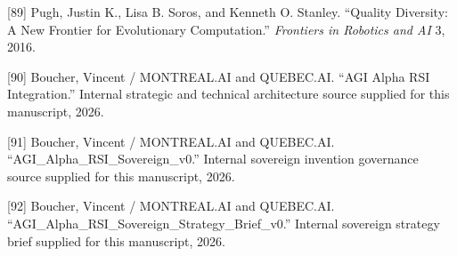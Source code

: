 \documentclass[
  11pt,
]{article}
\begin{document}
{[}89{]} Pugh, Justin K., Lisa B. Soros, and Kenneth O. Stanley.
``Quality Diversity: A New Frontier for Evolutionary Computation.''
\emph{Frontiers in Robotics and AI} 3, 2016.

{[}90{]} Boucher, Vincent / MONTREAL.AI and QUEBEC.AI. ``AGI Alpha RSI
Integration.'' Internal strategic and technical architecture source
supplied for this manuscript, 2026.

{[}91{]} Boucher, Vincent / MONTREAL.AI and QUEBEC.AI.
``AGI\_Alpha\_RSI\_Sovereign\_v0.'' Internal sovereign invention
governance source supplied for this manuscript, 2026.

{[}92{]} Boucher, Vincent / MONTREAL.AI and QUEBEC.AI.
``AGI\_Alpha\_RSI\_Sovereign\_Strategy\_Brief\_v0.'' Internal sovereign
strategy brief supplied for this manuscript, 2026.
\end{document}
